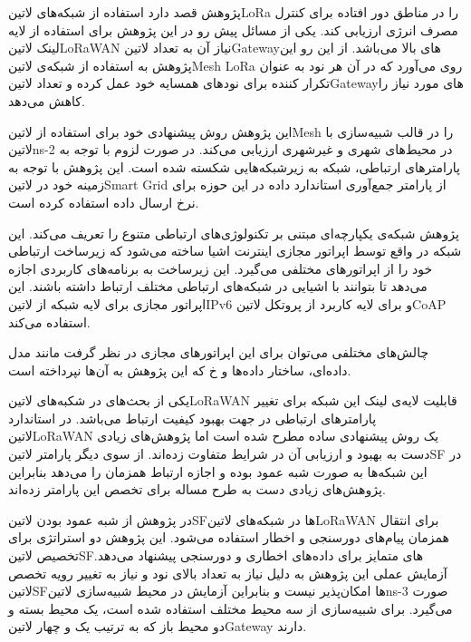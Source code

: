 پژوهش  قصد دارد استفاده از شبکه‌های ‌لاتین{LoRa} را در مناطق دور افتاده برای کنترل مصرف انرژی ارزیابی کند.
یکی از مسائل پیش رو در این پژوهش برای استفاده از لایه لینک ‌لاتین{LoRaWAN} نیاز آن به تعداد ‌لاتین{Gateway}های بالا می‌باشد.
از این رو این پژوهش به استفاده از شبکه‌ی ‌لاتین{Mesh LoRa} روی می‌آورد که در آن هر نود به عنوان تکرار کننده برای نودهای همسایه خود عمل کرده
و تعداد ‌لاتین{Gateway}های مورد نیاز را کاهش می‌دهد.

این پژوهش روش پیشنهادی خود برای استفاده از ‌لاتین{Mesh} را در قالب شبیه‌سازی با ‌لاتین{ns-2} در محیط‌های شهری و غیرشهری ارزیابی می‌کند.
در صورت لزوم با توجه به پارامترهای ارتباطی، شبکه به زیرشبکه‌هایی شکسته شده است.
این پژوهش با توجه به زمینه خود در ‌لاتین{Smart Grid} از پارامتر جمع‌آوری استاندارد داده در این حوزه برای نرخ ارسال داده استفاده کرده است.



پژوهش  شبکه‌ی یکپارچه‌ای مبتنی بر تکنولوژی‌های ارتباطی متنوع را تعریف می‌کند. این شبکه در واقع توسط اپراتور مجازی اینترنت اشیا
ساخته می‌شود که زیرساخت ارتباطی خود را از اپراتورهای مختلفی می‌گیرد. این زیرساخت به برنامه‌های کاربردی اجازه می‌دهد تا بتوانند با اشیایی در شبکه‌های ارتباطی مختلف ارتباط داشته باشند.
این اپراتور مجازی برای لایه شبکه از ‌لاتین{IPv6} و برای لایه کاربرد از پروتکل ‌لاتین{CoAP} استفاده می‌کند.

چالش‌های مختلفی می‌توان برای این اپراتورهای مجازی در نظر گرفت مانند مدل داده‌ای، ساختار داده‌ها و ‌خ که این پژوهش به آن‌ها نپرداخته است.



یکی از بحث‌های در شکبه‌های ‌لاتین{LoRaWAN} قابلیت لایه‌ی لینک این شبکه برای تغییر پارامترهای ارتباطی در جهت بهبود کیفیت ارتباط می‌باشد. در استاندارد ‌لاتین{LoRaWAN} یک روش پیشنهادی ساده مطرح شده است
اما پژوهش‌های زیادی دست به بهبود و ارزیابی آن در شرایط متفاوت زده‌اند. از سوی دیگر پارامتر ‌لاتین{SF} در این شبکه‌ها به صورت شبه عمود بوده و اجازه ارتباط همزمان را می‌دهد بنابراین پژوهش‌های زیادی دست به طرح مساله
برای تخصص این پارامتر زده‌اند.


در پژوهش  از شبه عمود بودن ‌لاتین{SF}ها در شبکه‌های ‌لاتین{LoRaWAN} برای انتقال همزمان پیام‌های دورسنجی و اخطار استفاده می‌شود.
این پژوهش دو استراتژی برای تخصیص ‌لاتین{SF}های متمایز برای داده‌های اخطاری و دورسنجی پیشنهاد می‌دهد.
آزمایش عملی این پژوهش به دلیل نیاز به تعداد بالای نود و نیاز به تغییر رویه تخصص ‌لاتین{SF}ها امکان‌پذیر نیست و بنابراین آزمایش در محیط شبیه‌سازی ‌لاتین{ns-3} صورت می‌گیرد.
برای شبیه‌سازی از سه محیط مختلف استفاده شده است، یک محیط بسته و دو محیط باز که به ترتیب یک و چهار ‌لاتین{Gateway} دارند.

